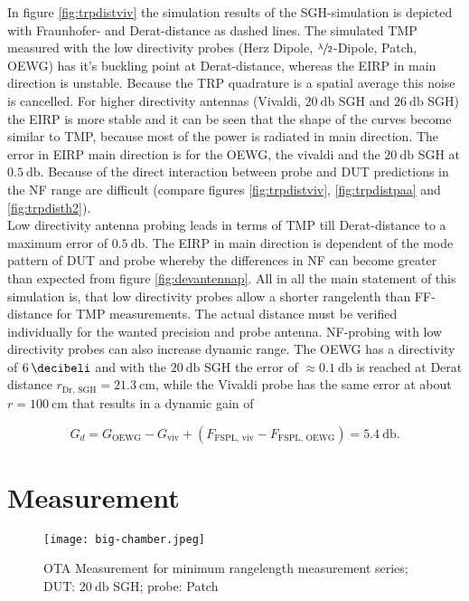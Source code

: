 In figure \ref{fig:trpdistviv} the simulation results of the \ac{SGH}-simulation is depicted with Fraunhofer- and Derat-distance as dashed lines. The simulated \ac{TMP} measured with the low directivity probes (Herz Dipole, $\sfrac{\lambda}{2}$-Dipole, Patch, \ac{OEWG}) has it's buckling point at Derat-distance, whereas the \ac{EIRP} in main direction is unstable. Because the \ac{TRP} quadrature is a spatial average this noise is cancelled. For higher directivity antennas (Vivaldi, $\SI{20}{\decibel}$ SGH and $\SI{26}{\decibel}$ SGH) the \ac{EIRP} is more stable and it can be seen that the shape of the curves become similar to \ac{TMP}, because most of the power is radiated in main direction. The error in \ac{EIRP} main direction is for the \ac{OEWG}, the vivaldi and the $\SI{20}{\decibel}$ \ac{SGH} at $\SI{0.5}{\decibel}$. Because of the direct interaction between probe and \ac{DUT} predictions in the \ac{NF} range are difficult (compare figures \ref{fig:trpdistviv}, \ref{fig:trpdistpaa} and \ref{fig:trpdisth2}).\\
Low directivity antenna probing leads in terms of \ac{TMP} till Derat-distance to a maximum error of $\SI{0.5}{\decibel}$. The \ac{EIRP} in main direction is dependent of the mode pattern of \ac{DUT} and probe whereby the differences in \ac{NF} can become greater than expected from figure \ref{fig:devantennap}. All in all the main statement of this simulation is, that low directivity probes allow a shorter rangelenth than \ac{FF}-distance for \ac{TMP} measurements. The actual distance must be verified individually for the wanted precision and probe antenna. \ac{NF}-probing with low directivity probes can also increase dynamic range. The \ac{OEWG} has a directivity of $\SI{6}{\decibeli}$ and with the $\SI{20}{\decibel}$ SGH the error of $\approx \SI{0.1}{\decibel}$ is reached at Derat distance $r_\text{Dr, SGH}=\SI{21.3}{\centi\meter}$, while the Vivaldi probe has the same error at about $r=\SI{100}{\centi\meter}$ that results in a dynamic gain of 

\begin{equation}
G_d = G_\text{OEWG}-G_\text{viv}+(F_\text{FSPL, viv}-F_\text{FSPL, OEWG})=\SI{5.4}{\decibel}.
\end{equation}

\section{Measurement}

\begin{figure}
\centering
\texttt{[image: big-chamber.jpeg]}
\caption{OTA Measurement for minimum rangelength measurement series; DUT: $\SI{20}{\decibel}$ SGH; probe: Patch}
\label{fig:otameas}
\end{figure}

